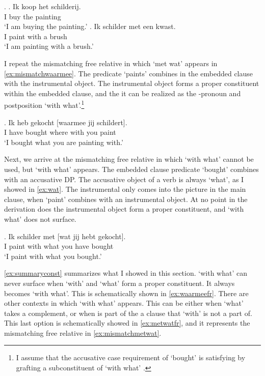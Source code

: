 \documentclass[12pt]{article}
\begin{document}
\ex.
\ag. Ik koop het schilderij.\\
 I buy the painting\\
 `I am buying the painting.'\label{ex:kopen}
\bg. Ik schilder met een kwast.\\
 I paint with a brush\\
 `I am painting with a brush.'\label{ex:schilderen}

I repeat the mismatching free relative in which  `met wat' appears in \ref{ex:mismatchwaarmee}. The predicate  `paints' combines in the embedded clause with the instrumental object. The instrumental object forms a proper constituent within the embedded clause, and the it can be realized as the -pronoun and postposition  `with what'.\footnote{I assume that the accusative case requirement of  `bought' is satisfying by grafting a subconstituent of  `with what' \citep{bergsma2019}.}

\exg. Ik heb gekocht [waarmee jij schildert].\\
 I have bought {where with} you paint\\
 `I bought what you are painting with.'\label{ex:mismatchwaarmee}

Next, we arrive at the mismatching free relative in which  `with what' cannot be used, but  `with what' appears. The embedded clause predicate  `bought' combines with an accusative DP. The accusative object of a verb is always  `what', as I showed in \ref{ex:wat}. The instrumental only comes into the picture in the main clause, when  `paint' combines with an instrumental object. At no point in the derivation does the instrumental object form a proper constituent, and  `with what' does not surface.

\exg. Ik schilder met [wat jij hebt gekocht].\\
 I paint with what you have bought\\
 `I paint with what you bought.'\label{ex:mismatchmetwat}

\ref{ex:summaryconst} summarizes what I showed in this section.  `with what' can never surface when  `with' and  `what' form a proper constituent. It always becomes  `with what'. This is schematically shown in \ref{ex:waarmeefr}.
There are other contexts in which  `with what' appears. This can be either when  `what' takes a complement, or when  is part of the a clause that  `with' is not a part of. This last option is schematically showed in \ref{ex:metwatfr}, and it represents the mismatching free relative in \ref{ex:mismatchmetwat}.
\end{document}
